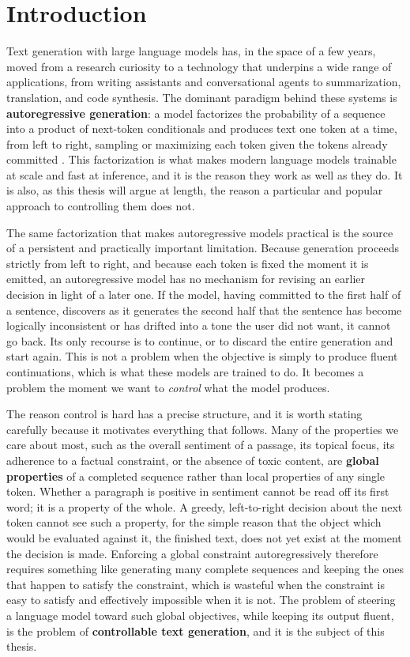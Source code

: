 \chapter{Introduction}
\label{ch:introduction}

Text generation with large language models has, in the space of a few years, moved from a research curiosity to a technology that underpins a wide range of applications, from writing assistants and conversational agents to summarization, translation, and code synthesis. The dominant paradigm behind these systems is \textbf{autoregressive generation}: a model factorizes the probability of a sequence into a product of next-token conditionals and produces text one token at a time, from left to right, sampling or maximizing each token given the tokens already committed \citep{radford2019language, brown2020language}. This factorization is what makes modern language models trainable at scale and fast at inference, and it is the reason they work as well as they do. It is also, as this thesis will argue at length, the reason a particular and popular approach to controlling them does not.

The same factorization that makes autoregressive models practical is the source of a persistent and practically important limitation. Because generation proceeds strictly from left to right, and because each token is fixed the moment it is emitted, an autoregressive model has no mechanism for revising an earlier decision in light of a later one. If the model, having committed to the first half of a sentence, discovers as it generates the second half that the sentence has become logically inconsistent or has drifted into a tone the user did not want, it cannot go back. Its only recourse is to continue, or to discard the entire generation and start again. This is not a problem when the objective is simply to produce fluent continuations, which is what these models are trained to do. It becomes a problem the moment we want to \emph{control} what the model produces.

The reason control is hard has a precise structure, and it is worth stating carefully because it motivates everything that follows. Many of the properties we care about most, such as the overall sentiment of a passage, its topical focus, its adherence to a factual constraint, or the absence of toxic content, are \textbf{global properties} of a completed sequence rather than local properties of any single token. Whether a paragraph is positive in sentiment cannot be read off its first word; it is a property of the whole. A greedy, left-to-right decision about the next token cannot see such a property, for the simple reason that the object which would be evaluated against it, the finished text, does not yet exist at the moment the decision is made. Enforcing a global constraint autoregressively therefore requires something like generating many complete sequences and keeping the ones that happen to satisfy the constraint, which is wasteful when the constraint is easy to satisfy and effectively impossible when it is not. The problem of steering a language model toward such global objectives, while keeping its output fluent, is the problem of \textbf{controllable text generation}, and it is the subject of this thesis.

